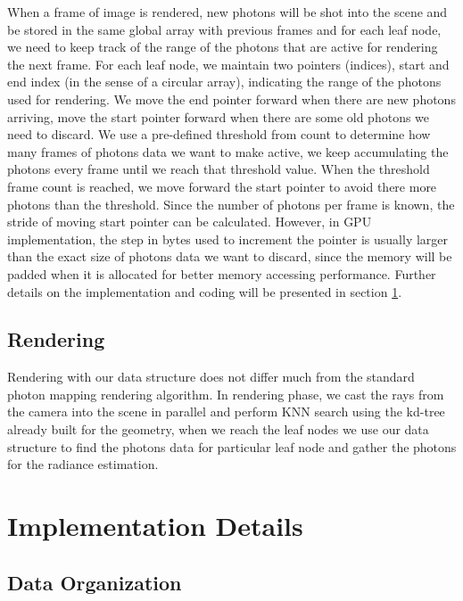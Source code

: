 When a frame of image is rendered, new photons will be shot into the scene and be stored in the same global array with previous frames and for each leaf node, we need to keep track of the range of the photons that are active for rendering the next frame. For each leaf node, we maintain two pointers (indices), start and end index (in the sense of a circular array), indicating the range of the photons used for rendering. We move the end pointer forward when there are new photons arriving, move the start pointer forward when there are some old photons we need to discard. We use a pre-defined threshold from count to determine how many frames of photons data we want to make active, we keep accumulating the photons every frame until we reach that threshold value. When the threshold frame count
is reached, we move forward the start pointer to avoid there more photons than the threshold. Since the number of photons per frame is known, the stride of moving start pointer can be calculated. 
However, in GPU implementation, the step in bytes used to increment the pointer is usually larger than the exact size of photons data we want to discard, since the memory will be padded when it is allocated for better memory accessing performance. Further details on the implementation and coding will be presented in section \ref{sec:impl_detials}.

\subsection{Rendering}

Rendering with our data structure does not differ much from the standard photon mapping rendering algorithm. In rendering phase, we cast the rays from the camera into the scene in parallel and perform KNN search using the kd-tree already built for the geometry, when we reach the leaf nodes we use our data structure to find the photons data for particular leaf node and gather the photons for the radiance estimation.

\section{Implementation Details}
\label{sec:impl_detials}

\subsection{Data Organization}
\label{subsec:data_org}

